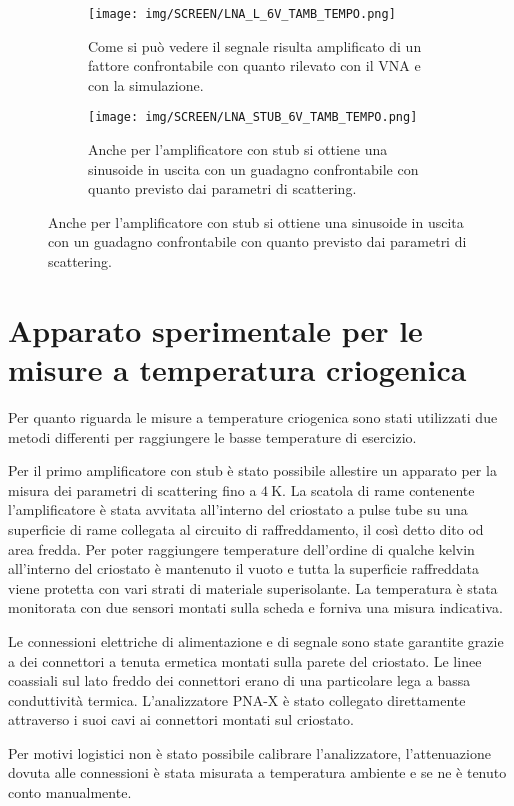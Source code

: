 \documentclass[12pt,oneside]{book}
\begin{document}
\begin{figure}[!htbp]
    \centering
    \begin{subfigure}[t]{0.48\textwidth}
        \centering
        \texttt{[image: img/SCREEN/LNA\_L\_6V\_TAMB\_TEMPO.png]}
        \caption{Come si può vedere il segnale risulta amplificato di un fattore confrontabile con quanto rilevato con il VNA e con la simulazione.}
    \end{subfigure}
    \hfill
    \begin{subfigure}[t]{0.48\textwidth}
        \centering
        \texttt{[image: img/SCREEN/LNA\_STUB\_6V\_TAMB\_TEMPO.png]}
        \caption{Anche per l'amplificatore con stub si ottiene una sinusoide in uscita con un guadagno confrontabile con quanto previsto dai parametri di scattering.}
    \end{subfigure}
    \hfill
\end{figure}


\section{Apparato sperimentale per le misure a temperatura criogenica}
Per quanto riguarda le misure a temperature criogenica sono stati utilizzati due metodi differenti per raggiungere le basse temperature di esercizio.

Per il primo amplificatore con stub è stato possibile allestire un apparato per la misura dei parametri di scattering fino a $\SI{4}{\kelvin}$. La scatola di rame contenente l'amplificatore è stata avvitata all'interno del criostato a pulse tube su una superficie di rame collegata al circuito di raffreddamento, il così detto dito od area fredda.
Per poter raggiungere temperature dell'ordine di qualche kelvin all'interno del criostato è mantenuto il vuoto e tutta la superficie raffreddata viene protetta con vari strati di materiale superisolante. La temperatura è stata monitorata con due sensori montati sulla scheda e forniva una misura indicativa. 

Le connessioni elettriche di alimentazione e di segnale sono state garantite grazie a dei connettori a tenuta ermetica montati sulla parete del criostato. Le linee coassiali sul lato freddo dei connettori erano di una particolare lega a bassa conduttività termica. L'analizzatore PNA-X è stato collegato direttamente attraverso i suoi cavi ai connettori montati sul criostato.

Per motivi logistici non è stato possibile calibrare l'analizzatore, l'attenuazione dovuta alle connessioni è stata misurata a temperatura ambiente e se ne è tenuto conto manualmente.
\end{document}
